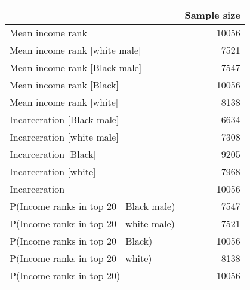 \begin{tabular}{lr}
\toprule
{} &  Sample size \\
\midrule
Mean income rank                       &        10056 \\
Mean income rank [white male]          &         7521 \\
Mean income rank [Black male]          &         7547 \\
Mean income rank [Black]               &        10056 \\
Mean income rank [white]               &         8138 \\
Incarceration [Black male]             &         6634 \\
Incarceration [white male]             &         7308 \\
Incarceration [Black]                  &         9205 \\
Incarceration [white]                  &         7968 \\
Incarceration                          &        10056 \\
P(Income ranks in top 20 $|$ Black male) &         7547 \\
P(Income ranks in top 20 $|$ white male) &         7521 \\
P(Income ranks in top 20 $|$ Black)      &        10056 \\
P(Income ranks in top 20 $|$ white)      &         8138 \\
P(Income ranks in top 20)              &        10056 \\
\bottomrule
\end{tabular}
